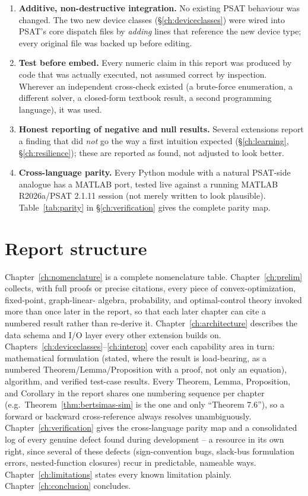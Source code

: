 \documentclass[11pt]{report}
\theoremstyle{plain}
\theoremstyle{definition}
\theoremstyle{remark}
\begin{document}
\begin{enumerate}
\item \textbf{Additive, non-destructive integration.} No existing PSAT
  behaviour was changed. The two new device classes
  (\S\ref{ch:deviceclasses}) were wired into PSAT's core dispatch files
  by \emph{adding} lines that reference the new device type; every
  original file was backed up before editing.
\item \textbf{Test before embed.} Every numeric claim in this report was
  produced by code that was actually executed, not assumed correct by
  inspection. Wherever an independent cross-check existed (a brute-force
  enumeration, a different solver, a closed-form textbook result, a
  second programming language), it was used.
\item \textbf{Honest reporting of negative and null results.} Several
  extensions report a finding that did \emph{not} go the way a first
  intuition expected (\S\ref{ch:learning}, \S\ref{ch:resilience}); these
  are reported as found, not adjusted to look better.
\item \textbf{Cross-language parity.} Every Python module with a natural
  PSAT-side analogue has a MATLAB port, tested live against a running
  MATLAB R2026a/PSAT 2.1.11 session (not merely written to look
  plausible). Table~\ref{tab:parity} in \S\ref{ch:verification} gives the
  complete parity map.
\end{enumerate}

\section{Report structure}

Chapter~\ref{ch:nomenclature} is a complete nomenclature table.
Chapter~\ref{ch:prelim} collects, with full proofs or precise
citations, every piece of convex-optimization, fixed-point, graph-linear-
algebra, probability, and optimal-control theory invoked more than once
later in the report, so that each later chapter can cite a numbered
result rather than re-derive it. Chapter~\ref{ch:architecture} describes
the data schema and I/O layer every other extension builds on.
Chapters~\ref{ch:deviceclasses}--\ref{ch:interop} cover each capability
area in turn: mathematical formulation (stated, where the result is
load-bearing, as a numbered Theorem/Lemma/Proposition with a proof, not
only an equation), algorithm, and verified test-case results. Every
Theorem, Lemma, Proposition, and Corollary in the report shares one
numbering sequence per chapter (e.g.\ Theorem~\ref{thm:bertsimas-sim} is
the one and only ``Theorem 7.6''), so a forward or backward
cross-reference always resolves unambiguously.
Chapter~\ref{ch:verification} gives the cross-language parity map and a
consolidated log of every genuine defect found during development -- a
resource in its own right, since several of these defects
(sign-convention bugs, slack-bus formulation errors, nested-function
closures) recur in predictable, nameable ways. Chapter~\ref{ch:limitations}
states every known limitation plainly. Chapter~\ref{ch:conclusion}
concludes.
\end{document}
